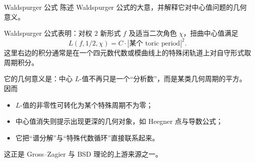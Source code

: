 \begin{problem}{Waldspurger 公式 \hard}
陈述 Waldspurger 公式的大意，并解释它对中心值问题的几何意义。
\end{problem}
\begin{solution}
Waldspurger 公式表明：对权 $2$ 新形式 $f$ 及适当二次角色 $\chi$，扭曲中心值满足
\[
L(f,1/2,\chi)=C\cdot |\text{某个 toric period}|^2.
\]
这里右边的积分通常是在一个四元数代数或模曲线上的特殊闭轨道上对自守形式取周期积分。

它的几何意义是：中心 $L$-值不再只是一个“分析数”，而是某类几何周期的平方。因而
\begin{itemize}
  \item $L$-值的非零性可转化为某个特殊周期不为零；
  \item 中心值消失则提示出现更深的几何对象，如 Heegner 点与导数公式；
  \item 它把“谱分解”与“特殊代数循环”直接联系起来。
\end{itemize}
这正是 Gross--Zagier 与 BSD 理论的上游来源之一。
\end{solution}
